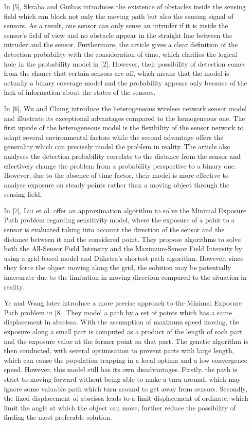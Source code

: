\documentclass[final]{elsarticle}
\begin{document}
In [5], Skraba and Guibas introduces the existence of obstacles inside the sensing field which can block not only the moving path but also the sensing signal of sensors. As a result, one sensor can only sense an intruder if it is inside the sensor's field of view and no obstacle appear in the straight line between the intruder and the sensor. Furthermore, the article gives a clear definition of the detection probability with the consideration of time, which clarifies the logical hole in the probability model in [2]. However, their possibility of detection comes from the chance that certain sensors are off, which means that the model is actually a binary coverage model and the probability appears only because of the lack of information about the states of the sensors.

In [6], Wu and Chung introduce the heterogeneous wireless network sensor model and illustrate its exceptional advantages compared to the homogeneous one. The first upside of the heterogeneous model is the flexibility of the sensor network to adapt several environmental factors while the second advantage offers the generality which can precisely model the problem in reality. The article also analyses the detection probability correlate to the distance from the sensor and effectively change the problem from a probability perspective to a binary one. However, due to the absence of time factor, their model is more effective to analyse exposure on steady points rather than a moving object through the sensing field.

In [7], Liu et al. offer an approximation algorithm to solve the Minimal Exposure Path problem regarding sensitivity model, where the exposure of a point to a sensor is evaluated taking into account the direction of the sensor and the distance between it and the considered point. They propose algorithms to solve both the All-Sensor Field Intensity and the  Maximum-Sensor Field Intensity by using a grid-based model and Djikstra's shortest path algorithm. However, since they force the object moving along the grid, the solution may be potentially inaccurate due to the limitation in moving direction compared to the situation in reality.

Ye and Wang later introduce a more precise approach to the Minimal Exposure Path problem in [8]. They model a path by a set of points which has a same displacement in abscissa. With the assumption of maximum speed moving, the exposure along a small part is computed as a product of the length of each part and the exposure value at the former point on that part. The genetic algorithm is then conducted, with several optimisation to prevent parts with large length, which can cause the population trapping in a local optima and a low convergence speed. However, this model still has its own disadvantages. Firstly, the path is strict to moving forward without being able to make a turn around, which may ignore some valuable path which turn around to get away from sensors. Secondly, the fixed displacement of abscissa leads to a limit displacement of ordinate, which limit the angle at which the object can move, further reduce the possibility of finding the most preferable solution.
\end{document}

